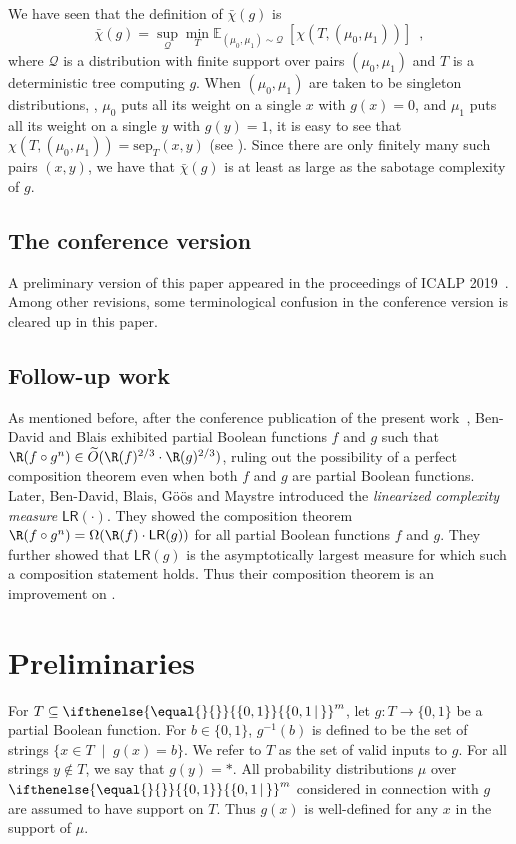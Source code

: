 \documentclass{toc}
\newcommand{\md}{\middle}
\newcommand{\set}[2][]{\ifthenelse{\equal{}{#1}}%
{\ensuremath{\left\{#2\right\}}}%
{\ensuremath{\left\{#2\,\md|\,#1\right\}}}}
\newcommand{\OI}{\set{0,1}}
\newcommand{\e}{\emph}
\newcommand{\clQ}{\mathcal{Q}}
\newcommand{\sep}{\mathrm{sep}}
\newcommand{\E}{\mathbb{E}}
\begin{document}
We have seen that the definition of $\bar \chi(g)$ is 
\[
\bar \chi(g) = \sup_{\clQ} \min_{T} \E_{(\mu_0, \mu_1) \sim \clQ}\ [ \chi(T, (\mu_0, \mu_1))] \enspace ,
\]
where $\clQ$ is a distribution with finite support over pairs $(\mu_0, \mu_1)$ and $T$ is a deterministic tree computing $g$.  When $(\mu_0, \mu_1)$ are taken to be singleton distributions, 
\ie, $\mu_0$ puts all its weight on a single $x$ with $g(x)=0$, and $\mu_1$ puts all its weight on a single $y$ with $g(y)=1$, it is easy to see that $\chi(T, (\mu_0, \mu_1)) = \sep_T(x,y)$ 
(see ).  Since there are only finitely many such pairs $(x, y)$, we have that $\bar \chi(g)$ is at least as large as the sabotage complexity of $g$.
%
\subsection{The conference version}
A preliminary version of this paper
appeared in the proceedings of ICALP 2019~\cite{conf-version}. Among other revisions, some terminological confusion in the conference version is cleared up in this paper.
%
\subsection{Follow-up work}
As mentioned before, after the conference publication of the
%
present work~\cite{conf-version},  %
Ben-David and Blais \cite{DBLP:journals/corr/abs-2002-10809} %
exhibited partial Boolean functions $f$ and $g$ such that $\R(f \circ g^n) \in \widetilde{O}(\R(f)^{2/3}\cdot \R(g)^{2/3})$, ruling out the possibility of a perfect composition theorem even when both $f$ and $g$ are partial Boolean functions. Later, Ben-David, Blais, G{\"o}{\"o}s and Maystre \cite{ben2022randomised} introduced the \e{linearized complexity measure} $\mathsf{LR}(\cdot)$. They showed the composition theorem $\R(f \circ g^n)=\Omega(\R(f)\cdot\mathsf{LR}(g))$ for all partial Boolean functions $f$ and $g$. They further showed that $\mathsf{LR}(g)$ is the asymptotically largest measure for which such a composition statement holds. Thus their composition theorem is an improvement on
.  %

\section{Preliminaries}
\label{prelims}
%
For $T \subseteq \OI^m$, let $g: T \to \{0,1\}$ be a partial Boolean function. For $b \in \{0,1\}$, $g^{-1}(b)$ is defined to be the set of strings $\{x \in T\;\mid\;g(x)=b\}$. We refer to $T$ as the set of valid inputs to $g$. For all strings $y \notin T$, we say that $g(y)=*$. All probability distributions $\mu$ over $\OI^m$ considered in connection with $g$ are assumed to have support on $T$. Thus $g(x)$ is well-defined for any $x$ in the support of $\mu$.
\end{document}
